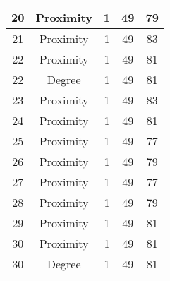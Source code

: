 \documentclass[results.tex]{subfiles}
\begin{document}
\begin{center}
\begin{tabular}{| c || c | c | c | c |}
            \hline
            20                      & Proximity                    & 1                      & 49                      & 79                   \\
            \hline
            21                      & Proximity                    & 1                      & 49                      & 83                   \\
            \hline
            22                      & Proximity                    & 1                      & 49                      & 81                   \\
            \hline
            22                      & Degree                       & 1                      & 49                      & 81                   \\
            \hline
            23                      & Proximity                    & 1                      & 49                      & 83                   \\
            \hline
            24                      & Proximity                    & 1                      & 49                      & 81                   \\
            \hline
            25                      & Proximity                    & 1                      & 49                      & 77                   \\
            \hline
            26                      & Proximity                    & 1                      & 49                      & 79                   \\
            \hline
            27                      & Proximity                    & 1                      & 49                      & 77                   \\
            \hline
            28                      & Proximity                    & 1                      & 49                      & 79                   \\
            \hline
            29                      & Proximity                    & 1                      & 49                      & 81                   \\
            \hline
            30                      & Proximity                    & 1                      & 49                      & 81                   \\
            \hline
            30                      & Degree                       & 1                      & 49                      & 81                   \\

\end{tabular}
\end{center}
\end{document}
